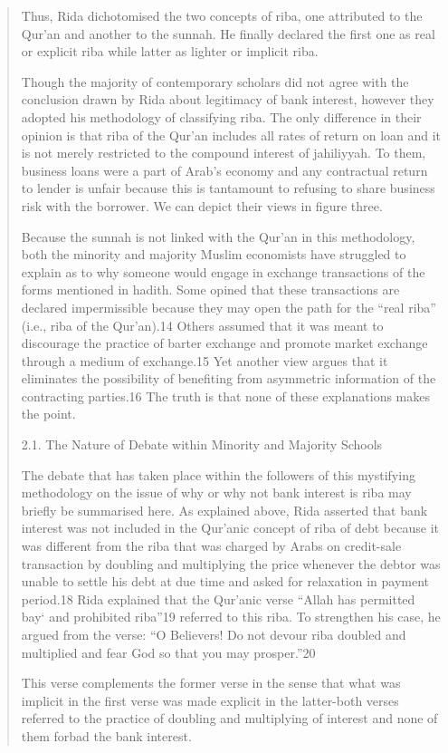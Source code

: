 \begin{quote}
Thus, Rida dichotomised the two concepts of riba, one attributed to the Qur'an and another to the sunnah. He finally declared the first one as real or explicit riba while latter as lighter or implicit riba.

Though the majority of contemporary scholars did not agree with the conclusion drawn by Rida about legitimacy of bank interest, however they adopted his methodology of classifying riba. The only difference in their opinion is that riba of the Qur'an includes all rates of return on loan and it is not merely restricted to the compound interest of jahiliyyah. To them, business loans were a part of Arab's economy and any contractual return to lender is unfair because this is tantamount to refusing to share business risk with the borrower. We can depict their views in figure three.

Because the sunnah is not linked with the Qur'an in this methodology, both the minority and majority Muslim economists have struggled to explain as to why someone would engage in exchange transactions of the forms mentioned in hadith. Some opined that these transactions are declared impermissible because they may open the path for the “real riba” (i.e., riba of the Qur'an).14 Others assumed that it was meant to discourage the practice of barter exchange and promote market exchange through a medium of exchange.15 Yet another view argues that it eliminates the possibility of benefiting from asymmetric information of the contracting parties.16 The truth is that none of these explanations makes the point.

2.1. The Nature of Debate within Minority and Majority Schools

The debate that has taken place within the followers of this mystifying methodology on the issue of why or why not bank interest is riba may briefly be summarised here. As explained above, Rida asserted that bank interest was not included in the Qur'anic concept of riba of debt because it was different from the riba that was charged by Arabs on credit-sale transaction by doubling and multiplying the price whenever the debtor was unable to settle his debt at due time and asked for relaxation in payment period.18 Rida explained that the Qur'anic verse “Allah has permitted bay‘ and prohibited riba”19 referred to this riba. To strengthen his case, he argued from the verse: “O Believers! Do not devour riba doubled and multiplied and fear God so that you may prosper.”20

This verse complements the former verse in the sense that what was implicit in the first verse was made explicit in the latter-both verses referred to the practice of doubling and multiplying of interest and none of them forbad the bank interest.


\end{quote}
